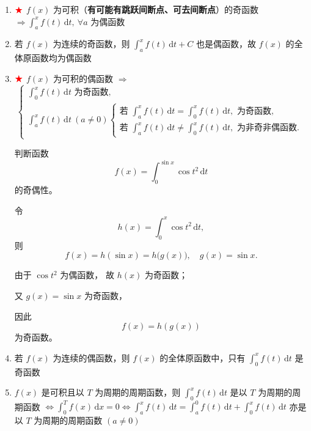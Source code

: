 \documentclass[a4paper,12pt]{article}
\begin{document}
    \begin{enumerate}

        \item ${\color{red}{\bigstar}}$\; $f(x)$ 为可积（\textbf{有可能有跳跃间断点、可去间断点}）的奇函数 $\Rightarrow \int_{a}^{x} f(t)\,\mathrm{d}t,\ \forall a$ 为偶函数

        \item 若 $f(x)$ 为连续的奇函数，则 $\int_{a}^{x} f(t)\,\mathrm{d}t + C$ 也是偶函数，故 $f(x)$ 的全体原函数均为偶函数

        \item ${\color{red}{\bigstar}}$\; $f(x)$ 为可积的偶函数 $\Rightarrow$
        \[
            \begin{cases}
                \int_{0}^{x} f(t)\,\mathrm{d}t \text{ 为奇函数}, \\[6pt]
                \int_{a}^{x} f(t)\,\mathrm{d}t \ (a \neq 0)
                \begin{cases}
                    \text{若 } \int_{a}^{x} f(t)\,\mathrm{d}t
                    =
                    \int_{0}^{x} f(t)\,\mathrm{d}t, \text{ 为奇函数}, \\[6pt]
                    \text{若 } \int_{a}^{x} f(t)\,\mathrm{d}t
                    \neq
                    \int_{0}^{x} f(t)\,\mathrm{d}t, \text{ 为非奇非偶函数}.
                \end{cases}
            \end{cases}
        \]
        \begin{analysisbox}[Example]

            判断函数
            \[
                f(x)=\int_0^{\sin x} \cos t^2\,\mathrm{d}t
            \]
            的奇偶性。

            令
            \[
                h(x)=\int_0^{x} \cos t^2\,\mathrm{d}t,
            \]
            则
            \[
                f(x)=h(\sin x)=h\bigl(g(x)\bigr),
                \quad g(x)=\sin x.
            \]

            由于 $\cos t^2$ 为偶函数，
            故 $h(x)$ 为奇函数；

            又 $g(x)=\sin x$ 为奇函数，

            因此
            \[
                f(x)=h(g(x))
            \]
            为奇函数。

        \end{analysisbox}

        \item 若 $f(x)$ 为连续的偶函数，则 $f(x)$ 的全体原函数中，只有 $\int_{0}^{x} f(t)\,\mathrm{d}t$ 是奇函数

        \item $f(x)$ 是可积且以 $T$ 为周期的周期函数，则 $\int_{0}^{x} f(t)\,\mathrm{d}t$ 是以 $T$ 为周期的周期函数 $\Leftrightarrow \int_{0}^{T} f(x)\,\mathrm{d}x = 0 \Leftrightarrow \int_{a}^{x} f(t)\,\mathrm{d}t = \int_{a}^{0} f(t)\,\mathrm{d}t + \int_{0}^{x} f(t)\,\mathrm{d}t$ 亦是以 $T$ 为周期的周期函数 $(a \neq 0)$

    \end{enumerate}
\end{document}
